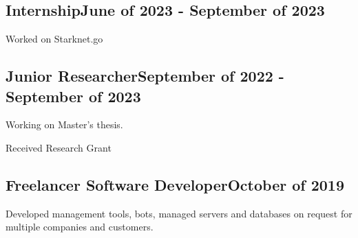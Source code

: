 \documentclass[a4paper,12pt]{article}
\begin{document}

\vspace*{6pt}
\subsection{{Internship}\hfill June of 2023 - September of 2023}
\begin{zitemize}
    \item Worked on Starknet.go
\end{zitemize}



\vspace*{6pt}
\subsection{{Junior Researcher}\hfill September of 2022 - September of 2023}
\begin{zitemize}
    \item Working on Master's thesis.
    \item Received Research Grant
\end{zitemize}

\vspace*{6pt}
\subsection{{Freelancer Software Developer}\hfill October of 2019}
\begin{zitemize}
\item Developed management tools, bots, managed servers and databases on request for multiple companies and customers.
\end{zitemize}
\end{document}

